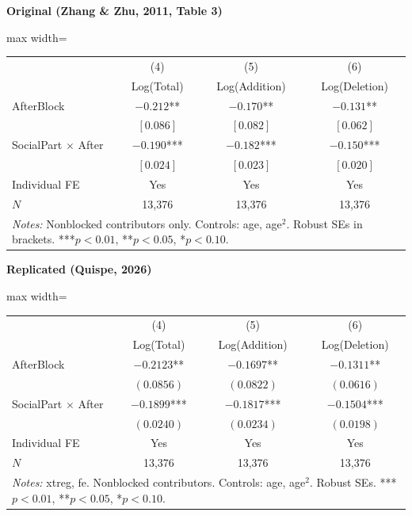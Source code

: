 \documentclass[11pt,a4paper]{article}
\begin{document}
\vspace{0.5cm}
\begin{minipage}[t]{0.48\textwidth}
\centering
\textbf{\large Original (Zhang \& Zhu, 2011, Table 3)}
\vspace{0.3cm}

\begin{adjustbox}{max width=\textwidth}
\begin{tabular}{lccc}
\toprule
 & (4) & (5) & (6) \\
 & Log(Total) & Log(Addition) & Log(Deletion) \\
\midrule
AfterBlock & $-0.212$** & $-0.170$** & $-0.131$** \\
 & $[0.086]$ & $[0.082]$ & $[0.062]$ \\[0.3em]
SocialPart $\times$ After & $-0.190$*** & $-0.182$*** & $-0.150$*** \\
 & $[0.024]$ & $[0.023]$ & $[0.020]$ \\[0.3em]
\midrule
Individual FE & Yes & Yes & Yes \\
$N$ & 13,376 & 13,376 & 13,376 \\
\bottomrule
\multicolumn{4}{p{0.95\textwidth}}{\footnotesize\textit{Notes:} Nonblocked contributors only. Controls: age, age$^2$. Robust SEs in brackets. ***$p<0.01$, **$p<0.05$, *$p<0.10$.}
\end{tabular}
\end{adjustbox}
\end{minipage}%
\hfill
\begin{minipage}[t]{0.48\textwidth}
\centering
\textbf{\large Replicated (Quispe, 2026)}
\vspace{0.3cm}

\begin{adjustbox}{max width=\textwidth}
\begin{tabular}{lccc}
\toprule
 & (4) & (5) & (6) \\
 & Log(Total) & Log(Addition) & Log(Deletion) \\
\midrule
AfterBlock & $-0.2123$** & $-0.1697$** & $-0.1311$** \\
 & $(0.0856)$ & $(0.0822)$ & $(0.0616)$ \\[0.3em]
SocialPart $\times$ After & $-0.1899$*** & $-0.1817$*** & $-0.1504$*** \\
 & $(0.0240)$ & $(0.0234)$ & $(0.0198)$ \\[0.3em]
\midrule
Individual FE & Yes & Yes & Yes \\
$N$ & 13,376 & 13,376 & 13,376 \\
\bottomrule
\multicolumn{4}{p{0.95\textwidth}}{\footnotesize\textit{Notes:} xtreg, fe. Nonblocked contributors. Controls: age, age$^2$. Robust SEs. ***$p<0.01$, **$p<0.05$, *$p<0.10$.}
\end{tabular}
\end{adjustbox}
\end{minipage}
\end{document}
